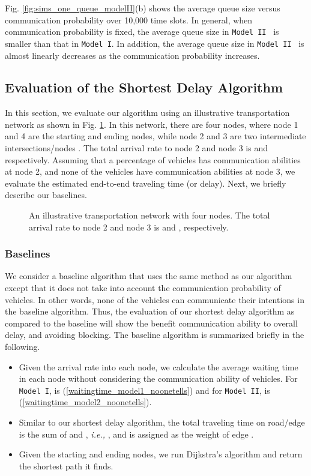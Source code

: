 \documentclass[conference]{IEEEtran}
\newcommand{\ie}{{\em i.e., }}
\newcommand{\modelI}{{\tt{Model I}}}
\newcommand{\modelII}{{\tt{Model II}}}
\begin{document}
Fig. \ref{fig:sims_one_queue_modelII}(b) shows the average queue size versus communication probability  over 10,000 time slots. In general, when communication probability  is fixed, the average queue size in \modelII~ is smaller than that in \modelI. In addition, the average queue size in \modelII~ is almost linearly decreases as the communication probability  increases.



\vspace{-5pt}
\subsection{Evaluation of the Shortest Delay Algorithm}
In this section, we evaluate our algorithm using an illustrative transportation network as shown in Fig. \ref{roadmodel1}.
In this network, there are four nodes, where node 1 and 4 are the starting and ending nodes, while node 2 and 3 are two intermediate intersections/nodes . The total arrival rate to node 2 and node 3 is  and  respectively. Assuming that a percentage of vehicles has communication abilities at node 2, and none of the vehicles have communication abilities at node 3, we evaluate the estimated end-to-end traveling time (or delay). Next, we briefly describe our baselines.

\begin{figure} [t!]
\vspace{10pt}
\centering
{}
\vspace{-5pt}
\caption{An illustrative transportation network with four nodes. The total arrival rate to node 2 and node 3 is  and , respectively.}
\vspace{-5pt}
\label{roadmodel1}
\end{figure}

\subsubsection{Baselines}
We consider a baseline algorithm that uses the same method as our algorithm except that it does not take into account the communication probability of vehicles. In other words, none of the vehicles can communicate their intentions in the baseline algorithm. Thus, the evaluation of our shortest delay algorithm as compared to the baseline will show the benefit communication ability to overall delay, and avoiding blocking. The baseline algorithm is summarized briefly in the following.
\begin{itemize}
\item Given the arrival rate into each node, we calculate the average waiting time  in each node without considering the communication ability of vehicles. For \modelI,  is (\ref{waitingtime_model1_noonetells}) and for \modelII,  is (\ref{waitingtime_model2_noonetells}).
\item Similar to our shortest delay algorithm, the total traveling time  on road/edge  is the sum of  and , \ie , and is assigned as the weight of edge .
\item Given the starting and ending nodes, we run Dijkstra's algorithm and return the shortest path it finds.
\end{itemize}
\end{document}
